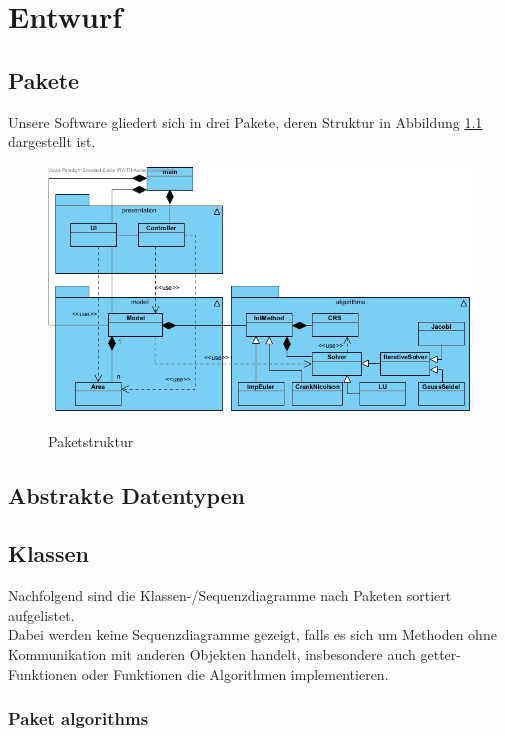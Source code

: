 \chapter{Entwurf}
\section{Pakete}
Unsere Software gliedert sich in drei Pakete, deren Struktur in Abbildung \ref{Paketdiagramm} dargestellt ist.

\begin{figure}[H]
	\centering
	\includegraphics[scale=.65]{Bilder/Paketdiagramm.jpg}\\
	\caption{Paketstruktur}
	\label{Paketdiagramm}
\end{figure}

\section{Abstrakte Datentypen}

\section{Klassen}

Nachfolgend sind die Klassen-/Sequenzdiagramme nach Paketen sortiert aufgelistet. \\
Dabei werden keine Sequenzdiagramme gezeigt, falls es sich um Methoden ohne Kommunikation mit anderen Objekten handelt, insbesondere auch getter-Funktionen oder Funktionen die Algorithmen implementieren.

\subsection{Paket algorithms}

